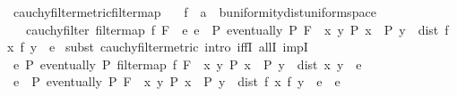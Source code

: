 \begin{isabellebody}
\isamarkupfalse%
\ cauchy{\isacharunderscore}{\kern0pt}filter{\isacharunderscore}{\kern0pt}metric{\isacharunderscore}{\kern0pt}filtermap{\isacharcolon}{\kern0pt}\isanewline
\ \ \ f\ {\isacharcolon}{\kern0pt}{\isacharcolon}{\kern0pt}\ {\isachardoublequoteopen}{\isacharprime}{\kern0pt}a\ {\isasymRightarrow}\ {\isacharprime}{\kern0pt}b{\isacharcolon}{\kern0pt}{\isacharcolon}{\kern0pt}{\isacharbraceleft}{\kern0pt}uniformity{\isacharunderscore}{\kern0pt}dist{\isacharcomma}{\kern0pt}uniform{\isacharunderscore}{\kern0pt}space{\isacharbraceright}{\kern0pt}{\isachardoublequoteclose}\isanewline
\ \ \ {\isachardoublequoteopen}cauchy{\isacharunderscore}{\kern0pt}filter\ {\isacharparenleft}{\kern0pt}filtermap\ f\ F{\isacharparenright}{\kern0pt}\ {\isasymlongleftrightarrow}\ {\isacharparenleft}{\kern0pt}{\isasymforall}e{\isachardot}{\kern0pt}\ e{\isachargreater}{\kern0pt}{}\ {\isasymlongrightarrow}\ {\isacharparenleft}{\kern0pt}{\isasymexists}P{\isachardot}{\kern0pt}\ eventually\ P\ F\ {\isasymand}\ {\isacharparenleft}{\kern0pt}{\isasymforall}x\ y{\isachardot}{\kern0pt}\ P\ x\ {\isasymand}\ P\ y\ {\isasymlongrightarrow}\ dist\ {\isacharparenleft}{\kern0pt}f\ x{\isacharparenright}{\kern0pt}\ {\isacharparenleft}{\kern0pt}f\ y{\isacharparenright}{\kern0pt}\ {\isacharless}{\kern0pt}\ e{\isacharparenright}{\kern0pt}{\isacharparenright}{\kern0pt}{\isacharparenright}{\kern0pt}{\isachardoublequoteclose}\isanewline
%
\isadelimproof
%
\endisadelimproof
%
\isatagproof
{}\isamarkupfalse%
\ {\isacharparenleft}{\kern0pt}subst\ cauchy{\isacharunderscore}{\kern0pt}filter{\isacharunderscore}{\kern0pt}metric{\isacharcomma}{\kern0pt}\ intro\ iffI\ allI\ impI{\isacharparenright}{\kern0pt}\isanewline
\ \ \isamarkupfalse%
\ {\isacartoucheopen}{\isasymforall}e{\isachargreater}{\kern0pt}{}{\isachardot}{\kern0pt}\ {\isasymexists}P{\isachardot}{\kern0pt}\ eventually\ P\ {\isacharparenleft}{\kern0pt}filtermap\ f\ F{\isacharparenright}{\kern0pt}\ {\isasymand}\ {\isacharparenleft}{\kern0pt}{\isasymforall}x\ y{\isachardot}{\kern0pt}\ P\ x\ {\isasymand}\ P\ y\ {\isasymlongrightarrow}\ dist\ x\ y\ {\isacharless}{\kern0pt}\ e{\isacharparenright}{\kern0pt}{\isacartoucheclose}\isanewline
\ \ \isamarkupfalse%
\ \isamarkupfalse%
\ {\isacartoucheopen}e{\isachargreater}{\kern0pt}{}\ {\isasymLongrightarrow}\ {\isasymexists}P{\isachardot}{\kern0pt}\ eventually\ P\ F\ {\isasymand}\ {\isacharparenleft}{\kern0pt}{\isasymforall}x\ y{\isachardot}{\kern0pt}\ P\ x\ {\isasymand}\ P\ y\ {\isasymlongrightarrow}\ dist\ {\isacharparenleft}{\kern0pt}f\ x{\isacharparenright}{\kern0pt}\ {\isacharparenleft}{\kern0pt}f\ y{\isacharparenright}{\kern0pt}\ {\isacharless}{\kern0pt}\ e{\isacharparenright}{\kern0pt}{\isacartoucheclose}\ \ e\isanewline

\end{isabellebody}
